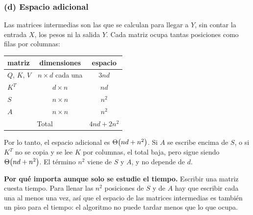 \subsubsection*{(d) Espacio adicional}

Las matrices intermedias son las que se calculan para llegar a $Y$, sin contar la entrada
$X$, los pesos ni la salida $Y$. Cada matriz ocupa tantas posiciones como filas por
columnas:
\begin{center}
\begin{tabular}{lcc}
  \toprule
  matriz & dimensiones & espacio \\
  \midrule
  $Q$, $K$, $V$ & $n \times d$ cada una & $3 n d$ \\
  $K^T$         & $d \times n$ & $n d$ \\
  $S$           & $n \times n$ & $n^2$ \\
  $A$           & $n \times n$ & $n^2$ \\
  \midrule
  \multicolumn{2}{c}{Total} & $4 n d + 2 n^2$ \\
  \bottomrule
\end{tabular}
\end{center}
Por lo tanto, el espacio adicional es $\Theta\!\left(n d + n^2\right)$. Si $A$ se escribe encima de $S$,
o si $K^T$ no se copia y se lee $K$ por columnas, el total baja, pero sigue siendo
$\Theta\!\left(n d + n^2\right)$. El término $n^2$ viene de $S$ y $A$, y no depende de $d$.

\textbf{Por qué importa aunque solo se estudie el tiempo.} Escribir una matriz cuesta
tiempo. Para llenar las $n^2$ posiciones de $S$ y de $A$ hay que escribir cada una al
menos una vez, así que el espacio de las matrices intermedias es también un piso para el
tiempo: el algoritmo no puede tardar menos que lo que ocupa.

